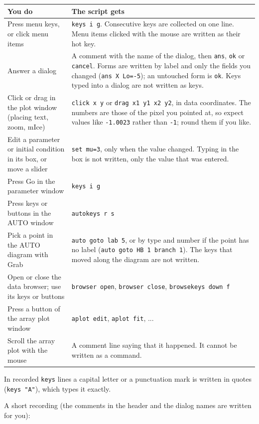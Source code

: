 \documentclass{article}
\begin{document}
\begin{longtable}[]{@{}p{}p{}@{}}
\toprule\noalign{}
You do & The script gets \\
\midrule\noalign{}
\endhead
\bottomrule\noalign{}
\endlastfoot
Press menu keys, or click menu items & \texttt{keys\ i\ g}. Consecutive keys are collected on one line.
Menu items clicked with the mouse are written as their hot key. \\
Answer a dialog & A comment with the name of the dialog, then \texttt{ans},
\texttt{ok} or \texttt{cancel}. Forms are written by label and
only the fields you changed (\texttt{ans\ X\ Lo=-5}); an untouched form
is \texttt{ok}. Keys typed into a dialog are not written as
keys. \\
Click or drag in the plot window (placing text, zoom, mIce) & \texttt{click\ x\ y} or \texttt{drag\ x1\ y1\ x2\ y2}, in data
coordinates. The numbers are those of the pixel you pointed at, so
expect values like \texttt{-1.0023} rather than \texttt{-1};
round them if you like. \\
Edit a parameter or initial condition in its box, or move a
slider & \texttt{set\ mu=3}, only when the value changed. Typing in the
box is not written, only the value that was entered. \\
Press Go in the parameter window & \texttt{keys\ i\ g} \\
Press keys or buttons in the AUTO window & \texttt{autokeys\ r\ s} \\
Pick a point in the AUTO diagram with Grab & \texttt{auto\ goto\ lab\ 5}, or by type and number if the point has
no label (\texttt{auto\ goto\ HB\ 1\ branch\ 1}). The keys that moved
along the diagram are not written. \\
Open or close the data browser; use its keys or buttons & \texttt{browser\ open}, \texttt{browser\ close},
\texttt{browsekeys\ down\ f} \\
Press a button of the array plot window & \texttt{aplot\ edit}, \texttt{aplot\ fit}, ... \\
Scroll the array plot with the mouse & A comment line saying that it happened. It cannot be written as a
command. \\
\end{longtable}

In recorded \texttt{keys} lines a capital letter or a punctuation
mark is written in quotes (\texttt{keys\ "A"}), which types
it exactly.

A short recording (the comments in the header and the dialog names
are written for you):
\end{document}
